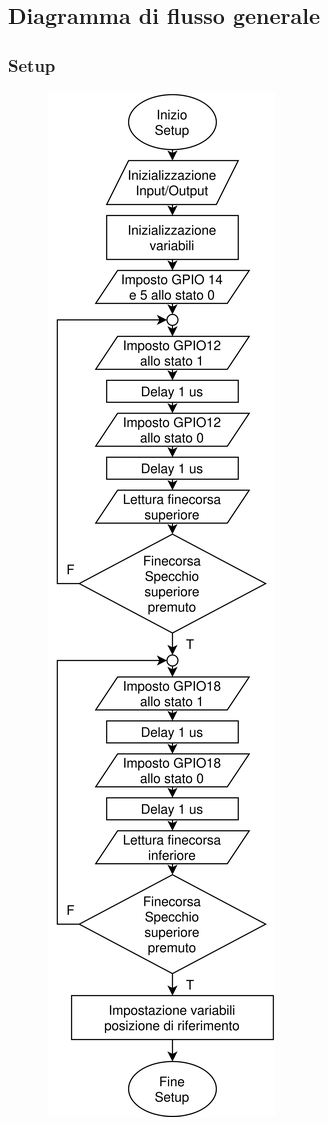 \documentclass[12pt]{article}
\begin{document}
    \subsection{Diagramma di flusso generale}
        \subsubsection{Setup}
            \begin{figure}[h]
            \centering
                \includegraphics[height=\textheight-145pt]{Draws/Flowchart/Setup.png}
                \label{setup_flowchart}
            \end{figure}
        
\end{document}
